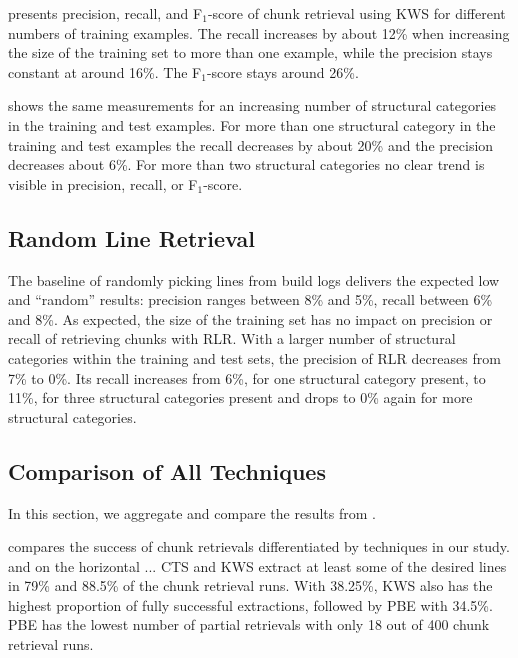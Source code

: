  presents precision,
recall, and F$_{1}$-score of chunk retrieval using KWS for different
numbers of training examples.
The recall increases by about 12\% when
increasing the size of the training set to more than one example,
while the precision stays constant at around 16\%.
The F$_{1}$-score
stays around 26\%.

 shows the same
measurements for an increasing number of structural categories in the
training and test examples.
For more than one structural category in
the training and test examples the recall decreases by about 20\% and
the precision decreases about 6\%.
For more than two structural
categories no clear trend is visible in precision, recall, or
F$_{1}$-score.

\subsection{Random Line Retrieval}
\label{sec:r:rlr}

The baseline of randomly
picking lines from build logs delivers the expected low and
``random'' results: precision ranges between 8\% and 5\%,
recall between 6\% and 8\%.
As expected, the size of the training set has no impact on precision
or recall of retrieving chunks with RLR.
With a larger number of structural categories within the training and
test sets, the precision of RLR decreases from 7\% to 0\%.
Its recall
increases from 6\%, for one structural category present, to 11\%, for
three structural categories present and drops to 0\% again for more
structural categories.


\subsection{Comparison of All Techniques}
In this section, we aggregate and compare the results from
.

 compares the success of chunk
retrievals differentiated by techniques in our study.
and on the horizontal ...
CTS and KWS
extract at least some of the desired lines in 79\% and 88.5\%
of the chunk retrieval runs.
With 38.25\%, KWS also has the highest proportion of fully
successful extractions, followed by PBE with 34.5\%.
PBE has the
lowest number of partial retrievals with only 18 out of 400 chunk
retrieval runs.

